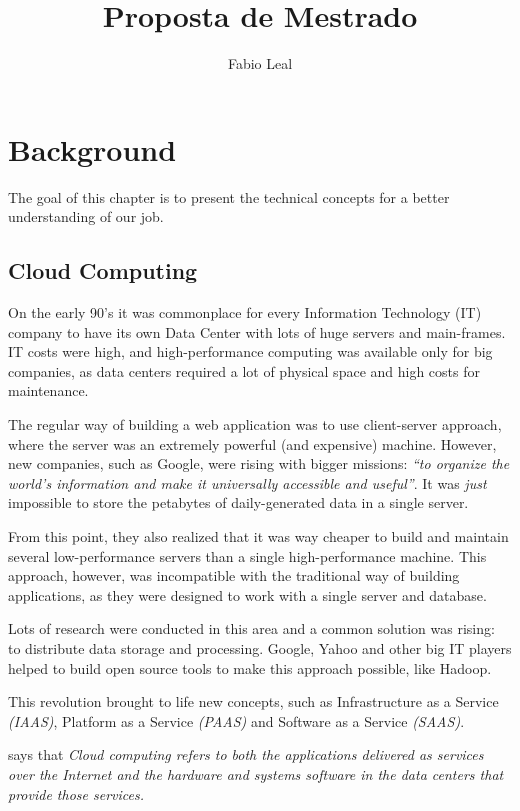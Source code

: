 \documentclass{article}
\begin{document}
\title{Proposta de Mestrado}
\author{Fabio Leal}
\maketitle  





\section{Background}
The goal of this chapter is to present the technical concepts for a better understanding of our job. 


\subsection{Cloud Computing}
On the early 90's it was commonplace for every Information Technology (IT) company to have its own Data Center with lots of huge servers and main-frames. IT costs were high, and high-performance computing was available only for big companies, as data centers required a lot of physical space and high costs for maintenance. 

The regular way of building a web application was to use client-server approach, where the server was an extremely powerful (and expensive) machine. However, new companies, such as Google, were rising with bigger missions: \textit{``to organize the world's information and make it universally accessible and useful''}. It was \textit{just} impossible to store the petabytes of daily-generated data in a single server. 

From this point, they also realized that it was way cheaper to build and maintain several low-performance servers than a single high-performance machine. This approach, however, was incompatible with the traditional way of building applications, as they were designed to work with a single server and database. 

Lots of research were conducted in this area and a common solution was rising: to distribute data storage and processing. Google, Yahoo and other big IT players helped to build open source tools to make this approach possible, like Hadoop.

This revolution brought to life new concepts, such as Infrastructure as a Service \textit{(IAAS)}, Platform as a Service \textit{(PAAS)} and Software as a Service \textit{(SAAS)}. 

\cite{AViewOfCloudComputing} says that \textit{Cloud computing refers to both the applications delivered as services over the Internet and the hardware and systems software in the data centers that provide those services.} 
\end{document}
